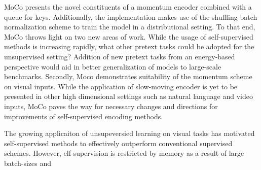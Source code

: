 \documentclass[10pt,letterpaper]{article}
\begin{document}
MoCo presents the novel constituents of a momentum encoder combined with a queue for keys. Additionally, the implementation makes use of the shuffling batch normalization scheme to train the model in a distributional setting. To that end, MoCo throws light on two new areas of work. While the usage of self-supervised methods is increasing rapidly, what other pretext tasks could be adopted for the unsupervised setting? Addition of new pretext tasks from an energy-based perspective would aid in better generalization of models to large-scale benchmarks. Secondly, Moco demonstrates suitability of the momentum scheme on visual inputs. While the application of slow-moving encoder is yet to be presented in other high dimensional settings such as natural language and video inputs, MoCo paves the way for necessary changes and directions for improvements of self-supervised encoding methods.

The growing applicaiton of unsupeversied learning on visual tasks has motivated self-supervised methods to effectively outperform conventional supervised schemes. However, elf-supervision is restricted by memory as a result of large batch-sizes and 
\end{document}
